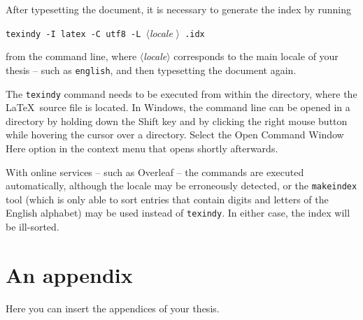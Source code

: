 \documentclass[
  digital,     %
  oneside,     %
  nosansbold,  %
  nocolorbold, %
  lof,         %
  lot,         %
]{fithesis4}
\begin{document}
After typesetting the document, it is necessary to generate the
index by running
\begin{center}%
  \texttt{texindy -I latex -C utf8 -L }$\langle$\textit{locale}%
  $\rangle$\texttt{ \jobname.idx}
\end{center}
from the command line, where $\langle$\textit{locale}$\rangle$
corresponds to the main locale of your thesis -- such as
\texttt{english}, and then typesetting the document again.

The \texttt{texindy} command needs to be executed from within the
directory, where the \LaTeX\ source file is located. In Windows,
the command line can be opened in a directory by holding down the
\textsf{Shift} key and by clicking the right mouse button while
hovering the cursor over a directory. Select the \textsf{Open Command
Window Here} option in the context menu that opens shortly
afterwards.

With online services -- such as Overleaf -- the commands are
executed automatically, although the locale may be erroneously
detected, or the \texttt{makeindex} tool (which is only able to
sort entries that contain digits and letters of the English
alphabet) may be used instead of \texttt{texindy}. In either case,
the index will be ill-sorted.

  \makeatletter\thesis@blocks@clear\makeatother
  \printindex

\appendix %
\chapter{An appendix}
Here you can insert the appendices of your thesis.
\end{document}
